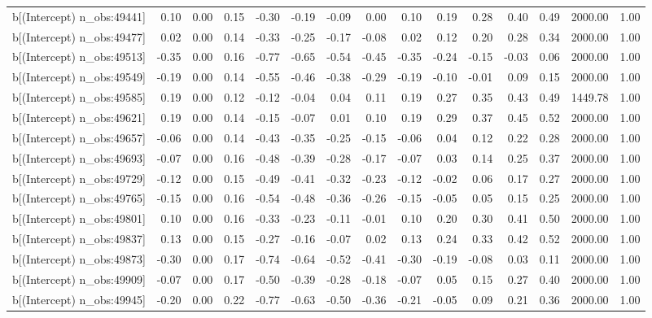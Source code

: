 \begin{table}[ht]
\begin{tabular}{rrrrrrrrrrrrrrr}
  b[(Intercept) n\_obs:49441] & 0.10 & 0.00 & 0.15 & -0.30 & -0.19 & -0.09 & 0.00 & 0.10 & 0.19 & 0.28 & 0.40 & 0.49 & 2000.00 & 1.00 \\ 
  b[(Intercept) n\_obs:49477] & 0.02 & 0.00 & 0.14 & -0.33 & -0.25 & -0.17 & -0.08 & 0.02 & 0.12 & 0.20 & 0.28 & 0.34 & 2000.00 & 1.00 \\ 
  b[(Intercept) n\_obs:49513] & -0.35 & 0.00 & 0.16 & -0.77 & -0.65 & -0.54 & -0.45 & -0.35 & -0.24 & -0.15 & -0.03 & 0.06 & 2000.00 & 1.00 \\ 
  b[(Intercept) n\_obs:49549] & -0.19 & 0.00 & 0.14 & -0.55 & -0.46 & -0.38 & -0.29 & -0.19 & -0.10 & -0.01 & 0.09 & 0.15 & 2000.00 & 1.00 \\ 
  b[(Intercept) n\_obs:49585] & 0.19 & 0.00 & 0.12 & -0.12 & -0.04 & 0.04 & 0.11 & 0.19 & 0.27 & 0.35 & 0.43 & 0.49 & 1449.78 & 1.00 \\ 
  b[(Intercept) n\_obs:49621] & 0.19 & 0.00 & 0.14 & -0.15 & -0.07 & 0.01 & 0.10 & 0.19 & 0.29 & 0.37 & 0.45 & 0.52 & 2000.00 & 1.00 \\ 
  b[(Intercept) n\_obs:49657] & -0.06 & 0.00 & 0.14 & -0.43 & -0.35 & -0.25 & -0.15 & -0.06 & 0.04 & 0.12 & 0.22 & 0.28 & 2000.00 & 1.00 \\ 
  b[(Intercept) n\_obs:49693] & -0.07 & 0.00 & 0.16 & -0.48 & -0.39 & -0.28 & -0.17 & -0.07 & 0.03 & 0.14 & 0.25 & 0.37 & 2000.00 & 1.00 \\ 
  b[(Intercept) n\_obs:49729] & -0.12 & 0.00 & 0.15 & -0.49 & -0.41 & -0.32 & -0.23 & -0.12 & -0.02 & 0.06 & 0.17 & 0.27 & 2000.00 & 1.00 \\ 
  b[(Intercept) n\_obs:49765] & -0.15 & 0.00 & 0.16 & -0.54 & -0.48 & -0.36 & -0.26 & -0.15 & -0.05 & 0.05 & 0.15 & 0.25 & 2000.00 & 1.00 \\ 
  b[(Intercept) n\_obs:49801] & 0.10 & 0.00 & 0.16 & -0.33 & -0.23 & -0.11 & -0.01 & 0.10 & 0.20 & 0.30 & 0.41 & 0.50 & 2000.00 & 1.00 \\ 
  b[(Intercept) n\_obs:49837] & 0.13 & 0.00 & 0.15 & -0.27 & -0.16 & -0.07 & 0.02 & 0.13 & 0.24 & 0.33 & 0.42 & 0.52 & 2000.00 & 1.00 \\ 
  b[(Intercept) n\_obs:49873] & -0.30 & 0.00 & 0.17 & -0.74 & -0.64 & -0.52 & -0.41 & -0.30 & -0.19 & -0.08 & 0.03 & 0.11 & 2000.00 & 1.00 \\ 
  b[(Intercept) n\_obs:49909] & -0.07 & 0.00 & 0.17 & -0.50 & -0.39 & -0.28 & -0.18 & -0.07 & 0.05 & 0.15 & 0.27 & 0.40 & 2000.00 & 1.00 \\ 
  b[(Intercept) n\_obs:49945] & -0.20 & 0.00 & 0.22 & -0.77 & -0.63 & -0.50 & -0.36 & -0.21 & -0.05 & 0.09 & 0.21 & 0.36 & 2000.00 & 1.00 \\ 

\end{tabular}
\end{table}
